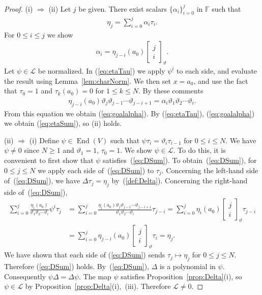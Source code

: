 \documentclass[pdftex]{sigma}
\numberwithin{equation}{section}
\begin{document}
\begin{proof}
(i) $\Rightarrow$ (ii) Let $j$ be given. There exist scalars $\lbrace \alpha_i \rbrace_{i=0}^j$
in $\mathbb F$ such that
\begin{gather}
\eta_j = \sum_{i=0}^j \alpha_i \tau_i.
\label{eq:etaTau}
\end{gather}
For $0 \leq i \leq j$ we show
\begin{gather}
\alpha_i = \eta_{j-i}(a_0)
\left[\begin{matrix} j \\
i \end{matrix} \right]_\vartheta. \label{eq:goalalpha}
\end{gather}
Let $\psi \in \mathcal L$ be normalized. In
(\ref{eq:etaTau}) we apply $\psi^i$ to each side,
and evaluate the
result using
Lemma~\ref{lem:charNorm}.
We then set $x=a_0$, and use the fact that
$\tau_0=1$ and $\tau_k (a_0)=0$ for $1 \leq k \leq N$.
By these comments
\begin{gather*}
\eta_{j-i} (a_0)
\vartheta_j \vartheta_{j-1} \cdots \vartheta_{j-i+1}
= \alpha_i \vartheta_1 \vartheta_2 \cdots \vartheta_i.
\end{gather*}
From this equation we obtain
(\ref{eq:goalalpha}).
By (\ref{eq:etaTau}),
(\ref{eq:goalalpha})
we obtain (\ref{eq:etaSum}), so (ii) holds.

(ii) $\Rightarrow$ (i) Define
 $\psi \in \operatorname{End}(V)$ such that
 $\psi \tau_i = \vartheta_i \tau_{i-1}$ for $0 \leq i \leq N$.
 We have $\psi \not=0$ since $N\geq 1$ and $\vartheta_1=1$,
 $\tau_0=1$. We show $\psi \in \mathcal L$.
To do this, it is convenient to first show that $\psi$ satisfies~(\ref{eq:DSum}).
To obtain~(\ref{eq:DSum}),
for $0 \leq j \leq N$ we apply
each side of~(\ref{eq:DSum}) to $\tau_j$.
Concerning the left-hand side of~(\ref{eq:DSum}),
we have $\Delta \tau_j = \eta_j$
by~(\ref{def:Delta}).
Concerning the right-hand side of~(\ref{eq:DSum}),
\begin{align*}
\sum_{i=0}^j \frac{\eta_i(a_0)}{\vartheta_1 \vartheta_2\cdots \vartheta_i}
\psi^i \tau_j &=
\sum_{i=0}^j \frac{\eta_i(a_0)
\vartheta_j \vartheta_{j-1} \cdots \vartheta_{j-i+1}
}{\vartheta_1 \vartheta_2\cdots \vartheta_i}
 \tau_{j-i}
=
\sum_{i=0}^j \eta_i(a_0)
\left[\begin{matrix} j \\
i \end{matrix} \right]_\vartheta
 \tau_{j-i}
\\
 &=
\sum_{i=0}^j \eta_{j-i}(a_0)
\left[\begin{matrix} j \\
i \end{matrix} \right]_\vartheta
 \tau_{i}
=\eta_j.
\end{align*}
We have shown that each side of
(\ref{eq:DSum}) sends $\tau_j \mapsto \eta_j$ for $0 \leq j \leq N$.
Therefore (\ref{eq:DSum}) holds. By~(\ref{eq:DSum}), $\Delta$ is a polynomial in $\psi$.
Consequently $\psi \Delta = \Delta \psi$.
The map $\psi$ satisfies
Proposition~\ref{prop:Delta}(i),
so $\psi \in \mathcal L$ by
Proposition~\ref{prop:Delta}(i),~(iii).
Therefore $\mathcal L \not=0$.


\end{proof}
\end{document}
